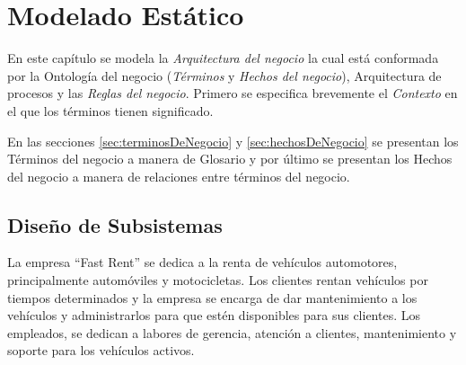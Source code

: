 \chapter{Modelado Estático}	
\label{cap:reqSist}

	En este capítulo se modela la {\em Arquitectura del negocio} la cual está conformada por la Ontología del negocio ({\em Términos} y {\em Hechos del negocio}), Arquitectura de procesos y las {\em Reglas del negocio}. Primero se especifica brevemente el {\em Contexto} en el que los términos tienen significado.
	
	En las secciones \ref{sec:terminosDeNegocio} y \ref{sec:hechosDeNegocio} se presentan los Términos del negocio a manera de Glosario y por último se presentan los Hechos del negocio a manera de relaciones entre términos del negocio.

\section{Diseño de Subsistemas}

	La empresa ``Fast Rent'' se dedica a la renta de vehículos automotores, principalmente automóviles y motocicletas. Los clientes rentan vehículos por tiempos determinados y la empresa se encarga de dar mantenimiento a los vehículos y administrarlos para que estén disponibles para sus clientes. Los empleados, se dedican a labores de gerencia, atención a clientes, mantenimiento y soporte para los vehículos activos.
	
